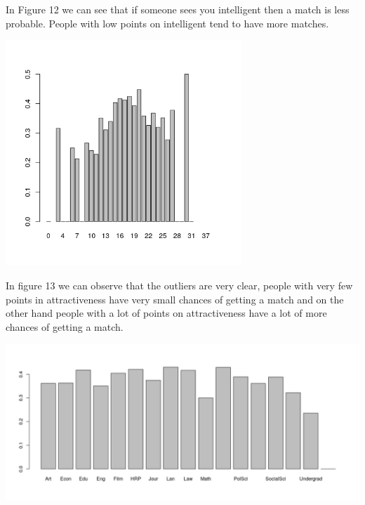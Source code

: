 In Figure 12 we can see that if someone sees you intelligent then a match is less probable. People with low points on intelligent tend to have more matches.



\begin{center}
\includegraphics[width=3.5in]{images/Hist_Plots_Analysis/bivar_match_attr.png}
\label{fig:aLabelForReferencing}
\end{center}

In figure 13 we can observe that the outliers are very clear, people with very few points in attractiveness have very small chances of getting a match and on the other hand people with a lot of points on attractiveness have a lot of more chances of getting a match.

\begin{center}
\includegraphics[width=5.5in]{images/Hist_Plots_Analysis/bivar_match_field_cd.png}
\label{fig:aLabelForReferencing}
\end{center}


